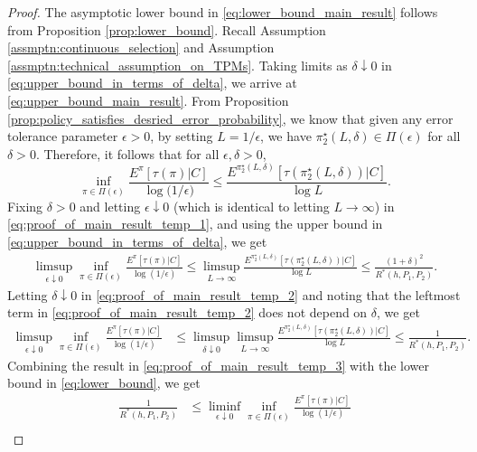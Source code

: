 \begin{proof}
The asymptotic lower bound in \eqref{eq:lower_bound_main_result} follows from Proposition \ref{prop:lower_bound}. Recall Assumption \ref{assmptn:continuous_selection} and Assumption \ref{assmptn:technical_assumption_on_TPMs}. Taking limits as $\delta \downarrow 0$ in \eqref{eq:upper_bound_in_terms_of_delta}, we arrive at \eqref{eq:upper_bound_main_result}. From Proposition \ref{prop:policy_satisfies_desried_error_probability}, we know that given any error tolerance parameter $\epsilon>0$, by setting $L=1/\epsilon$, we have $\pi_2^\star(L, \delta)\in \Pi(\epsilon)$ for all $\delta>0$. Therefore, it follows that for all $\epsilon, \delta>0$,
\begin{equation}
\inf\limits_{\pi \in \Pi(\epsilon)} \frac{E^\pi[\tau(\pi)|C]}{\log \bigg(1/\epsilon\bigg)} \leq \frac{E^{\pi_2^\star(L, \delta)}[\tau(\pi_2^\star(L, \delta))|C]}{\log L}.
\label{eq:proof_of_main_result_temp_1}
\end{equation}
Fixing $\delta>0$ and letting $\epsilon\downarrow 0$ (which is identical to letting $L\to \infty$) in \eqref{eq:proof_of_main_result_temp_1}, and using the upper bound in \eqref{eq:upper_bound_in_terms_of_delta}, we get
\begin{align}
\limsup\limits_{\epsilon\downarrow 0}\inf\limits_{\pi\in\Pi(\epsilon)}\frac{E^\pi[\tau(\pi)|C]}{\log(1/\epsilon)} \leq \limsup\limits_{L\to\infty}\frac{E^{\pi_2^\star(L, \delta)}[\tau(\pi_2^\star(L, \delta))|C]}{\log L}
\leq \frac{(1+\delta)^2}{R^*(h, P_1,  P_2)}.
\label{eq:proof_of_main_result_temp_2}
\end{align}
Letting $\delta\downarrow 0$ in \eqref{eq:proof_of_main_result_temp_2} and noting that the leftmost term in \eqref{eq:proof_of_main_result_temp_2} does not depend on $\delta$, we get
\begin{align}
\limsup\limits_{\epsilon\downarrow 0}\inf\limits_{\pi\in\Pi(\epsilon)}\frac{E^\pi[\tau(\pi)|C]}{\log(1/\epsilon)} &\leq \limsup\limits_{\delta \downarrow 0}\limsup\limits_{L\to\infty}\frac{E^{\pi_2^\star(L, \delta)}[\tau(\pi_2^\star(L, \delta))|C]}{\log L}\leq \frac{1}{R^*(h, P_1,P_2)}.
\label{eq:proof_of_main_result_temp_3}
\end{align}
Combining the result in \eqref{eq:proof_of_main_result_temp_3} with the lower bound in \eqref{eq:lower_bound}, we get
\begin{align}
\frac{1}{R^*(h,P_1,P_2)} &\leq \liminf\limits_{\epsilon\downarrow 0}\inf\limits_{\pi\in\Pi(\epsilon)}\frac{E^\pi[\tau(\pi)|C]}{\log(1/\epsilon)} \nonumber\\

\end{align}
\end{proof}
